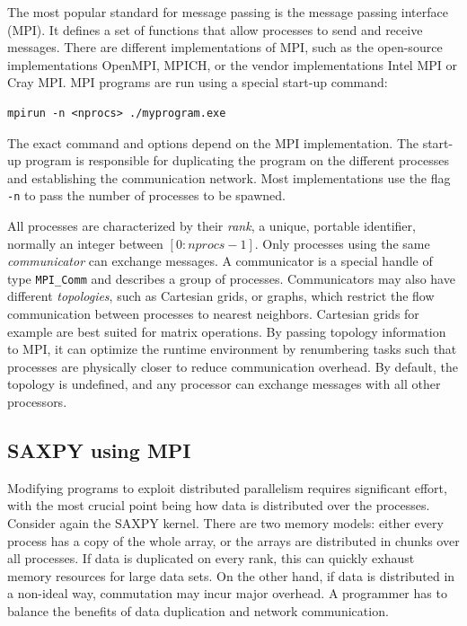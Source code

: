 The most popular standard for message passing is the message passing interface (MPI). It defines a set of functions that allow processes to send and receive messages. There are different implementations of MPI, such as the open-source implementations OpenMPI, MPICH, or the vendor implementations Intel MPI or Cray MPI. MPI programs are run using a special start-up command:
\begin{lstlisting}[backgroundcolor=\color{light-gray},breaklines=true]
mpirun -n <nprocs> ./myprogram.exe 
\end{lstlisting}
\noindent The exact command and options depend on the MPI implementation. The start-up program is responsible for duplicating the program on the different processes and establishing the communication network. Most implementations use the flag \texttt{-n} to pass the number of processes to be spawned. 

All processes are characterized by their \emph{rank}, a unique, portable identifier, normally an integer between $[0:nprocs-1]$. Only processes using the same \emph{communicator} can exchange messages. A communicator is a special handle of type \texttt{MPI{\_}Comm} and describes a group of processes. Communicators may also have different \emph{topologies}, such as Cartesian grids, or  graphs, which restrict the flow communication between processes to nearest neighbors. Cartesian grids for example are best suited for matrix operations. By passing topology information to MPI, it can optimize the runtime environment by renumbering tasks such that processes are physically closer to reduce communication overhead. By default, the topology is undefined, and any processor can exchange messages with all other processors.

\subsection{SAXPY using MPI}

Modifying programs to exploit distributed parallelism requires significant effort, with the most crucial point being how data is distributed over the processes. Consider again the SAXPY kernel. There are two memory models: either every process has a copy of the whole array, or the arrays are distributed in chunks over all processes. If data is duplicated on every rank, this can quickly exhaust memory resources for large data sets. On the other hand, if data is distributed in a non-ideal way, commutation may incur major overhead. A programmer has to balance the benefits of data duplication and network communication. 

